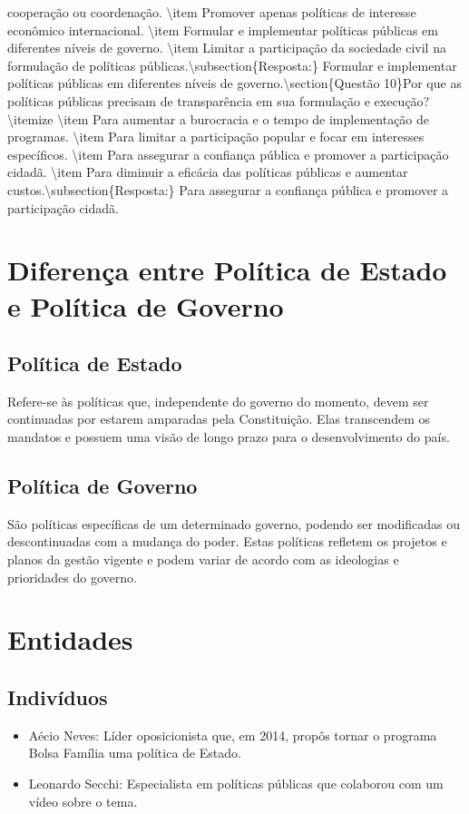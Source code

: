 \documentclass[
   article,       
   12pt,          
   oneside,       
   a4paper,       
   english,       
   brazil,        
   sumario=tradicional
   ]{abntex2}
\begin{document}
cooperação ou coordenação.    \textbackslash{}item Promover apenas políticas de interesse econômico internacional.    \textbackslash{}item Formular e implementar políticas públicas em diferentes níveis de governo.    \textbackslash{}item Limitar a participação da sociedade civil na formulação de políticas públicas.\textbackslash{}subsection\{Resposta:\} Formular e implementar políticas públicas em diferentes níveis de governo.\textbackslash{}section\{Questão 10\}Por que as políticas públicas precisam de transparência em sua formulação e execução?\textbackslash{}itemize    \textbackslash{}item Para aumentar a burocracia e o tempo de implementação de programas.    \textbackslash{}item Para limitar a participação popular e focar em interesses específicos.    \textbackslash{}item Para assegurar a confiança pública e promover a participação cidadã.    \textbackslash{}item Para diminuir a eficácia das políticas públicas e aumentar custos.\textbackslash{}subsection\{Resposta:\} Para assegurar a confiança pública e promover a participação cidadã.


\section{Diferença entre Política de Estado e Política de Governo}
\subsection{Política de Estado}
Refere-se às políticas que, independente do governo do momento, devem ser continuadas por estarem amparadas pela Constituição. Elas transcendem os mandatos e possuem uma visão de longo prazo para o desenvolvimento do país.
\subsection{Política de Governo}
São políticas específicas de um determinado governo, podendo ser modificadas ou descontinuadas com a mudança do poder. Estas políticas refletem os projetos e planos da gestão vigente e podem variar de acordo com as ideologias e prioridades do governo.
\section{Entidades}
\subsection{Indivíduos}
\begin{itemize}
    \item Aécio Neves: Líder oposicionista que, em 2014, propôs tornar o programa Bolsa Família uma política de Estado.
    \item Leonardo Secchi: Especialista em políticas públicas que colaborou com um vídeo sobre o tema.
\end{itemize}
\end{document}
